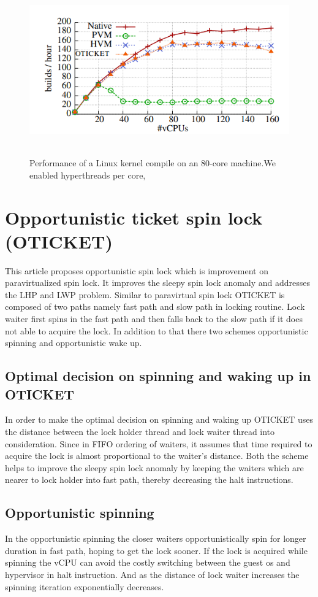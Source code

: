 \documentclass[conference]{IEEEtran}
\begin{document}
\begin{figure}
        \centering
       \includegraphics[scale=0.9]{Performance_1.PNG}~
       \caption{ Performance of a Linux kernel compile on an 80-core machine.We enabled hyperthreads per core, }\label{Fig:1}
 \end{figure}

\section{Opportunistic ticket spin lock (OTICKET)}
This article proposes opportunistic spin lock which is improvement on
paravirtualized spin lock.
It improves the sleepy spin lock anomaly and addresses the LHP and LWP
problem.
Similar to paravirtual spin lock OTICKET is composed of two paths namely
fast path and slow path in locking routine.
Lock waiter first spins in the fast path and then falls back to the slow path if it
does not able to acquire the lock.
In addition to that there two schemes opportunistic spinning
and opportunistic wake up.

\subsection{Optimal decision on spinning and waking up in OTICKET}
In order to make the optimal decision on spinning and waking up OTICKET
uses the distance between the lock holder thread and lock waiter thread into
consideration.
 Since in FIFO ordering of waiters, it assumes that time required to acquire the
lock is almost proportional to the waiter’s distance.
Both the scheme helps to improve the sleepy spin lock anomaly by keeping
the waiters which are nearer to lock holder into fast path, thereby decreasing
the halt instructions.
\subsection{Opportunistic spinning}
 In the opportunistic spinning the closer waiters opportunistically spin for
longer duration in fast path, hoping to get the lock sooner.
If the lock is acquired while spinning the vCPU can avoid the costly switching
between the guest os and hypervisor in halt instruction.
 And as the distance of lock waiter increases the spinning iteration
exponentially decreases.
\end{document}
